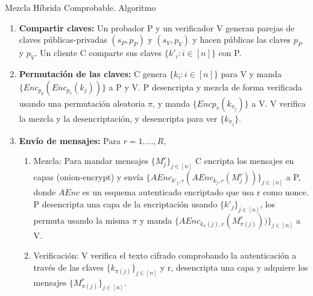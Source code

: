 \documentclass[10pt]{beamer}
\begin{document}
\begin{frame}{Mezcla Híbrida Comprobable. Algoritmo}
	\pause
	\small{
		\begin{enumerate}
			\item \textbf{Compartir claves:} Un probador P y un verificador V generan parejas de claves públicas-privadas $(s_P,p_P)$ y $(s_V,p_V)$ y hacen públicas las claves $p_P$ y $p_V$. Un cliente C comparte sus claves $\{k'_i: i \in [n]\}$ con P.
			\item \textbf{Permutación de las claves:} C genera $\{k_i: i \in [n]\}$ para V y manda $\{Enc_{p_p}(Enc_{p_v}(k_j))\}$ a P y V. P desencripta y mezcla de
			forma verificada usando una permutación aleatoria $\pi$, y manda
			$\{Enc{p_v}(k_{\pi_j})\}$ a V. V verifica la mezcla y la desencriptación, y desencripta para ver $\{k_{\pi _j}\}$.
			\item  \textbf{Envío de mensajes:} Para $r=1,...,R,$
			\begin{enumerate}
				\item Mezcla: Para mandar mensajes $\{M_j^r\}_{j \in [n]}$ C encripta los mensajes en capas (onion-encrypt) y envía
				$\{AEnc_{k'_j,r}(A Enc_{k_j ,r}(M_j ^r))\}_{j \in [n]}$ a P, donde $AEnc$ es un esquema autenticado encriptado que usa r como nonce. P desencripta una capa de la encriptación usando $\{k'_j\}_{j \in [n]}$, los permuta usando la misma $\pi$ y manda $\{AEnc_{k_\pi(j),r}(M_{\pi(j)} ^r))\}_{j \in [n]}$ a V.
				\item Verificación: V verifica el texto cifrado comprobando la autenticación a través de las claves $\{k_{\pi(j)}\}_{j \in [n]}$ y r, desencripta una capa y adquiere los mensajes $\{M_{\pi(j)}^r\}_{j \in [n]}$.
			\end{enumerate}
		\end{enumerate}
	}
	
\end{frame}

\end{document}
